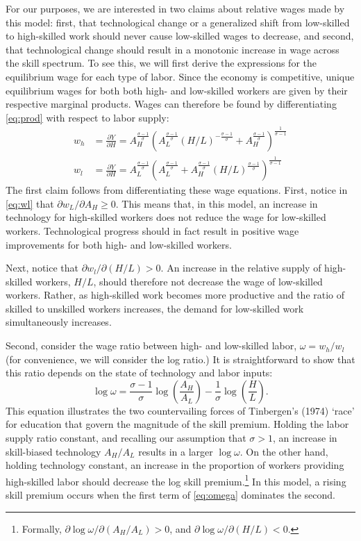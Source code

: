 For our purposes, we are interested in two claims about relative wages made by this model: first, that technological change or a generalized shift from low-skilled to high-skilled work should never cause low-skilled wages to decrease, and second, that technological change should result in a monotonic increase in wage across the skill spectrum. To see this, we will first derive the expressions for the equilibrium wage for each type of labor. Since the economy is competitive, unique equilibrium wages for both both high- and low-skilled workers are given by their respective marginal products. Wages can therefore be found by differentiating \eqref{eq:prod} with respect to labor supply:
\begin{align}
w_h &= \frac{\partial Y}{\partial H} 
     = A_H^\frac{\sigma-1}{\sigma}\left(
              A_L^{\frac{\sigma-1}{\sigma}} (H/L)^{-\frac{\sigma-1}{\sigma}} + A_H^{\frac{\sigma-1}{\sigma}}
        \right)^{\frac{1}{\sigma - 1}} \label{eq:wh} \\
w_l &= \frac{\partial Y}{\partial H} 
     = A_L^\frac{\sigma-1}{\sigma}\left(
              A_L^{\frac{\sigma-1}{\sigma}} + A_H^{\frac{\sigma-1}{\sigma}}(H/L)^{\frac{\sigma-1}{\sigma}}
        \right)^{\frac{1}{\sigma - 1}} \label{eq:wl}
\end{align}
The first claim follows from differentiating these wage equations. First, notice in \eqref{eq:wl} that $\partial w_L/\partial A_H \geq 0$. This means that, in this model, an increase in technology for high-skilled workers does not reduce the wage for low-skilled workers. Technological progress should in fact result in positive wage improvements for both high- and low-skilled workers. 

Next, notice that $\partial w_l/\partial(H/L)>0$. An increase in the relative supply of high-skilled workers, $H/L$, should therefore not decrease the wage of low-skilled workers. Rather, as high-skilled work becomes more productive and the ratio of skilled to unskilled workers increases, the demand for low-skilled work simultaneously increases. 

Second, consider the wage ratio between high- and low-skilled labor, $\omega=w_h/w_l$ (for convenience, we will consider the log ratio.) It is straightforward to show that this ratio depends on the state of technology and labor inputs:
\begin{equation}\label{eq:omega}
\log \omega = \frac{\sigma-1}{\sigma}\log\left(\frac{A_H}{A_L}\right) - \frac{1}{\sigma}\log\left(\frac{H}{L}\right).
\end{equation} %
This equation illustrates the two countervailing forces of Tinbergen's (1974) `race' for education that govern the magnitude of the skill premium. Holding the labor supply ratio constant, and recalling our assumption that $\sigma >1$, an increase in skill-biased technology $A_H/A_L$ results in a larger $\log\omega$. On the other hand, holding technology constant, an increase in the proportion of workers providing high-skilled labor should decrease the log skill premium.\footnote{Formally, $\partial \log\omega / \partial(A_H/A_L) > 0$, and 
$\partial \log\omega / \partial(H/L) < 0$.} In this model, a rising skill premium occurs when the first term of \eqref{eq:omega}  dominates the second.

